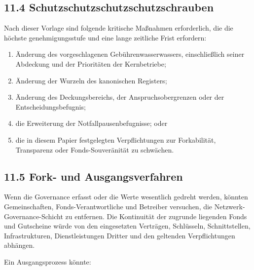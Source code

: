 \documentclass[11pt]{article}
\begin{document}
\subsection*{11.4 Schutzschutzschutzschutzschrauben}

Nach dieser Vorlage sind folgende kritische Maßnahmen erforderlich, die die höchste genehmigungsstufe und eine lange zeitliche Frist erfordern:

\begin{enumerate}[leftmargin=*]
\item Änderung des vorgeschlagenen Gebührenwasserwassers, einschließlich seiner Abdeckung und der Prioritäten der Kernbetriebe;
\item Änderung der Wurzeln des kanonischen Registers;
\item Änderung des Deckungsbereichs, der Anspruchsobergrenzen oder der Entscheidungsbefugnis;
\item die Erweiterung der Notfallpausenbefugnisse; oder
\item die in diesem Papier festgelegten Verpflichtungen zur Forkabilität, Transparenz oder Fonds-Souveränität zu schwächen.
\end{enumerate}
\subsection*{11.5 Fork- und Ausgangsverfahren}

Wenn die Governance erfasst oder die Werte wesentlich gedreht werden, könnten Gemeinschaften, Fonds-Verantwortliche und Betreiber versuchen, die Netzwerk-Governance-Schicht zu entfernen. Die Kontinuität der zugrunde liegenden Fonds und Gutscheine würde von den eingesetzten Verträgen, Schlüsseln, Schnittstellen, Infrastrukturen, Dienstleistungen Dritter und den geltenden Verpflichtungen abhängen.

Ein Ausgangsprozess könnte:
\end{document}
